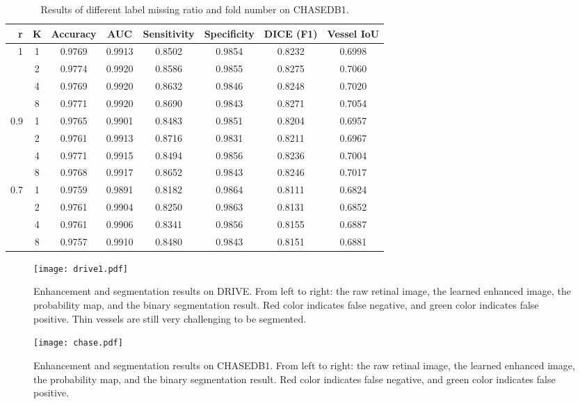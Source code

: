 \documentclass[runningheads]{llncs}
\begin{document}
\begin{table}[th]\setlength{\tabcolsep}{6pt}
\centering
\footnotesize
\caption{Results of different label missing ratio  and fold number  on CHASEDB1. }
\begin{tabular}{|r|c|c|c|c|c|c|c|}
\hline
r& K & Accuracy & AUC & Sensitivity & Specificity &   DICE (F1) &Vessel IoU  \\ \hline\hline
1&1&0.9769&0.9913&0.8502&0.9854&0.8232&0.6998\\ \hline
&2&0.9774&0.9920&0.8586&0.9855&0.8275&0.7060\\ \hline
&4&0.9769&0.9920&0.8632&0.9846&0.8248&0.7020\\ \hline
&8&0.9771&0.9920&0.8690&0.9843&0.8271&0.7054\\ \hline\hline
0.9&1&0.9765&0.9901&0.8483&0.9851&0.8204&0.6957\\ \hline
&2&0.9761&0.9913&0.8716&0.9831&0.8211&0.6967\\ \hline
&4&0.9771&0.9915&0.8494&0.9856&0.8236&0.7004\\ \hline
&8&0.9768&0.9917&0.8652&0.9843&0.8246&0.7017\\ \hline\hline
0.7&1&0.9759&0.9891&0.8182&0.9864&0.8111&0.6824\\ \hline
&2&0.9761&0.9904&0.8250&0.9863&0.8131&0.6852\\ \hline
&4&0.9761&0.9906&0.8341&0.9856&0.8155&0.6887\\ \hline
&8&0.9757&0.9910&0.8480&0.9843&0.8151&0.6881\\ \hline
\end{tabular}\label{exp:chase_full}
\end{table}
\begin{figure}[th]\centering
\texttt{[image: drive1.pdf]}
\caption{Enhancement and segmentation results on DRIVE. From left to right: the raw retinal image, the learned enhanced image, the probability map, and the binary segmentation result. Red color indicates false negative, and green color indicates false positive. Thin vessels are still very challenging to be segmented. }
  \label{fig:drive2}
\end{figure}
\clearpage
\begin{figure}[th]\centering
\texttt{[image: chase.pdf]}
\caption{Enhancement and segmentation results on CHASEDB1. From left to right: the raw retinal image, the learned enhanced image, the probability map, and the binary segmentation result. Red color indicates false negative, and green color indicates false positive. }
  \label{fig:chase}
\end{figure}
\clearpage




\end{document}
